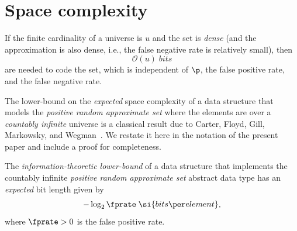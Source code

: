\section{Space complexity}
\label{sec:space_comp}

If the finite cardinality of a universe is $u$ and the set is \emph{dense} (and the approximation is also dense, i.e., the false negative rate is relatively
small), then
\begin{equation}
    \mathcal{O}(u) \; \si{bits}
\end{equation}
are needed to code the set, which is independent of $\p$, the false positive rate, and the false negative rate.

The lower-bound on the \emph{expected} space complexity of a data structure that models the \emph{positive random approximate set} where the elements are over a \emph{countably infinite} universe is a classical result due to Carter, Floyd, Gill, Markowsky, and Wegman~\cite{carterExact}.
We restate it here in the notation of the present paper and include a proof for completeness.
\begin{proposition}
\label{pst:approx_l_b}
The \emph{information-theoretic lower-bound} of a data structure that implements the countably infinite \emph{positive random approximate set} abstract data type has an \emph{expected} bit length given by
\begin{equation}
    -\log_2 \fprate \; \si{bits \per element},
\end{equation}
where $\fprate > 0$ is the false positive rate.
\end{proposition}
